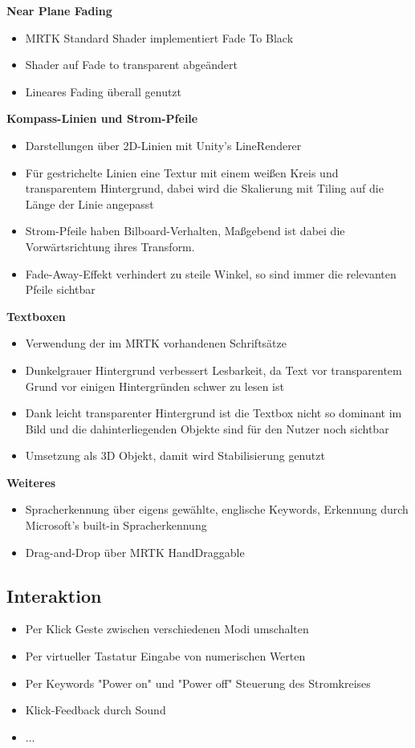 \textbf{Near Plane Fading}
\begin{itemize}
	\item MRTK Standard Shader implementiert Fade To Black
	\item Shader auf Fade to transparent abgeändert
	\item Lineares Fading überall genutzt
\end{itemize}

\textbf{Kompass-Linien und Strom-Pfeile}
\begin{itemize}
	\item Darstellungen über 2D-Linien mit Unity's LineRenderer
	\item Für gestrichelte Linien eine Textur mit einem weißen Kreis und transparentem Hintergrund, dabei wird die Skalierung mit Tiling auf die Länge der Linie angepasst
	\item Strom-Pfeile haben Bilboard-Verhalten, Maßgebend ist dabei die Vorwärtsrichtung ihres Transform.
	\item Fade-Away-Effekt verhindert zu steile Winkel, so sind immer die relevanten Pfeile sichtbar
\end{itemize}

\textbf{Textboxen}
\begin{itemize}
	\item Verwendung der im MRTK vorhandenen Schriftsätze
	\item Dunkelgrauer Hintergrund verbessert Lesbarkeit, da Text vor transparentem Grund vor einigen Hintergründen schwer zu lesen ist
	\item Dank leicht transparenter Hintergrund ist die Textbox nicht so dominant im Bild und die dahinterliegenden Objekte sind für den Nutzer noch sichtbar
	\item Umsetzung als 3D Objekt, damit wird Stabilisierung genutzt
\end{itemize}

\textbf{Weiteres}
\begin{itemize}
	\item Spracherkennung über eigens gewählte, englische Keywords, Erkennung durch Microsoft's built-in Spracherkennung
	\item Drag-and-Drop über MRTK HandDraggable 
\end{itemize}

\subsection{Interaktion}
\begin{itemize}
	\item Per Klick Geste zwischen verschiedenen Modi umschalten
	\item Per virtueller Tastatur Eingabe von numerischen Werten
	\item Per Keywords "Power on" und "Power off" Steuerung des Stromkreises
	\item Klick-Feedback durch Sound
	\item ...
\end{itemize}
